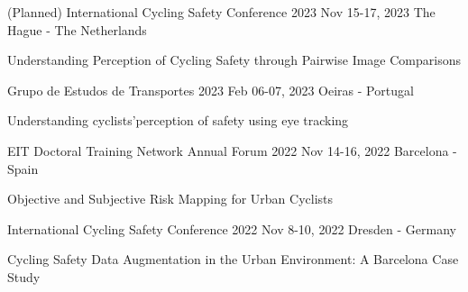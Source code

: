 

\begin{cventries}

\cventrypresentation
{(Planned) International Cycling Safety Conference 2023} %
{Nov 15-17, 2023} %
{The Hague - The Netherlands} %
{
	\begin{cvpresentationitems} %
		\item {} {Understanding Perception of Cycling Safety through Pairwise Image Comparisons}
	\end{cvpresentationitems}
}

\cventrypresentation
{Grupo de Estudos de Transportes 2023} %
{Feb 06-07, 2023} %
{Oeiras - Portugal} %
{
	\begin{cvpresentationitems} %
		\item {} {Understanding cyclists'perception of safety using eye tracking}
	\end{cvpresentationitems}
}

\cventrypresentation
	{EIT Doctoral Training Network Annual Forum 2022} %
	{Nov 14-16, 2022} %
	{Barcelona - Spain} %
	{
		\begin{cvpresentationitems} %
			\item {} {Objective and Subjective Risk Mapping for Urban Cyclists}
		\end{cvpresentationitems}
	}

  \cventrypresentation
	{International Cycling Safety Conference 2022} %
	{Nov 8-10, 2022} %
	{Dresden - Germany} %
	{
		\begin{cvpresentationitems} %
			\item {} {Cycling Safety Data Augmentation 
			in the Urban Environment: A Barcelona Case Study}
		\end{cvpresentationitems}
	}


\end{cventries}
